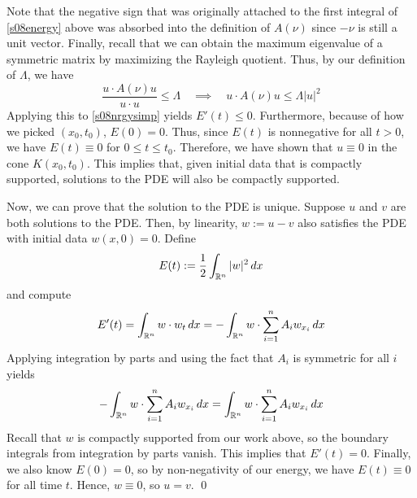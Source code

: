 Note that the negative sign that was originally attached to the first integral of \eqref{s08energy} above was absorbed into the definition of $A(\nu)$ since $-\nu$ is still a unit vector. Finally, recall that we can obtain the maximum eigenvalue of a symmetric matrix by maximizing the Rayleigh quotient. Thus, by our definition of $\Lambda$, we have
$$ \frac{u \cdot A(\nu) u}{u \cdot u} \leq \Lambda \quad \implies \quad u \cdot A(\nu) u \leq \Lambda |u|^2 $$
Applying this to \eqref{s08nrgysimp} yields $E'(t) \leq 0$. Furthermore, because of how we picked $(x_0,t_0)$, $E(0)=0$. Thus, since $E(t)$ is nonnegative for all $t > 0$, we have $E(t) \equiv 0$ for $0 \leq t \leq t_0$. Therefore, we have shown that $u \equiv 0$ in the cone $K(x_0,t_0)$. This implies that, given initial data that is compactly supported, solutions to the PDE will also be compactly supported.

\vspace{0.2cm}

Now, we can prove that the solution to the PDE is unique. Suppose $u$ and $v$ are both solutions to the PDE. Then, by linearity, $w :=u-v$ also satisfies the PDE with initial data $w(x,0) = 0$. Define
$$ E(t) := \frac{1}{2} \int_{\mathbb{R}^n} |w|^2 \, dx $$
and compute
$$ E'(t) = \int_{\mathbb{R}^n} w \cdot w_t \, dx = -\int_{\mathbb{R}^n} w \cdot \sum_{i=1}^n A_i w_{x_i} \, dx $$
Applying integration by parts and using the fact that $A_i$ is symmetric for all $i$ yields
$$ -\int_{\mathbb{R}^n} w \cdot \sum_{i=1}^n A_i w_{x_i} \, dx = \int_{\mathbb{R}^n} w \cdot \sum_{i=1}^n A_i w_{x_i} \, dx $$
Recall that $w$ is compactly supported from our work above, so the boundary integrals from integration by parts vanish. This implies that $E'(t) = 0$. Finally, we also know $E(0) = 0$, so by non-negativity of our energy, we have $E(t) \equiv 0$ for all time $t$. Hence, $w \equiv 0$, so $u=v$.
\hfill\qed

